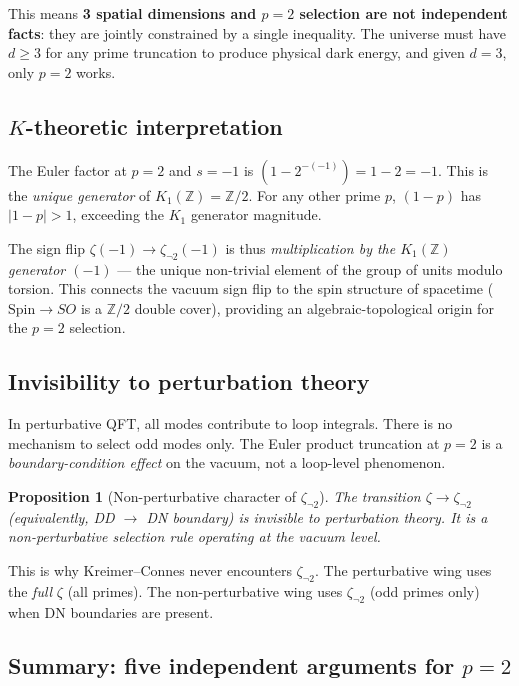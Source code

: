 \documentclass[11pt,a4paper]{article}
\newtheorem{proposition}{Proposition}
\begin{document}
This means \textbf{3 spatial dimensions and $p = 2$ selection
are not independent facts}: they are jointly constrained by a
single inequality. The universe must have $d \geq 3$ for any
prime truncation to produce physical dark energy, and given
$d = 3$, only $p = 2$ works.

\subsection{$K$-theoretic interpretation}

The Euler factor at $p = 2$ and $s = -1$ is $(1 - 2^{-(-1)}) =
1 - 2 = -1$. This is the \emph{unique generator} of
$K_1(\mathbb{Z}) = \mathbb{Z}/2$. For any other prime $p$,
$(1 - p)$ has $|1 - p| > 1$, exceeding the $K_1$ generator
magnitude.

The sign flip $\zeta(-1) \to \zeta_{\neg 2}(-1)$
is thus \emph{multiplication by the $K_1(\mathbb{Z})$ generator
$(-1)$} --- the unique non-trivial element of the group of units
modulo torsion. This connects the vacuum sign flip to the spin
structure of spacetime ($\text{Spin} \to SO$ is a $\mathbb{Z}/2$
double cover), providing an algebraic-topological origin for
the $p = 2$ selection.

\subsection{Invisibility to perturbation theory}

In perturbative QFT, all modes contribute to loop integrals.
There is no mechanism to select odd modes only. The Euler
product truncation at $p = 2$ is a \emph{boundary-condition
effect} on the vacuum, not a loop-level phenomenon.

\begin{proposition}[Non-perturbative character of $\zeta_{\neg 2}$]
The transition $\zeta \to \zeta_{\neg 2}$ (equivalently, DD $\to$
DN boundary) is invisible to perturbation theory. It is a
non-perturbative selection rule operating at the vacuum level.
\end{proposition}

This is why Kreimer--Connes never encounters $\zeta_{\neg 2}$.
The perturbative wing uses the \emph{full} $\zeta$ (all primes).
The non-perturbative wing uses $\zeta_{\neg 2}$ (odd primes only)
when DN boundaries are present.

\subsection{Summary: five independent arguments for $p = 2$}
\end{document}
